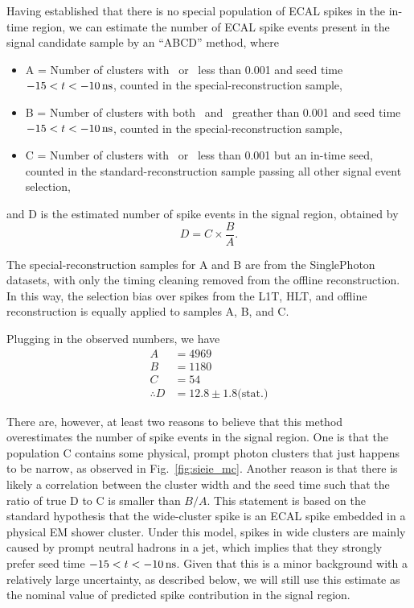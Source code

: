 Having established that there is no special population of ECAL spikes in the in-time region, we can estimate the number of ECAL spike events present in the signal candidate sample by an ``ABCD'' method, where
\begin{itemize}
  \item A = Number of clusters with \sieie\ or \sipip\ less than 0.001 and seed time $-15 < t < -10\, \text{ns}$, counted in the special-reconstruction sample,
  \item B = Number of clusters with both \sieie\ and \sipip\ greather than 0.001 and seed time $-15 < t < -10\, \text{ns}$, counted in the special-reconstruction sample, 
  \item C = Number of clusters with \sieie\ or \sipip\ less than 0.001 but an in-time seed, counted in the standard-reconstruction sample passing all other signal event selection, 
\end{itemize}
and D is the estimated number of spike events in the signal region, obtained by
\begin{equation}
  D = C \times \frac{B}{A}.
\end{equation}

The special-reconstruction samples for A and B are from the SinglePhoton datasets, with only the timing cleaning removed from the offline reconstruction.
In this way, the selection bias over spikes from the L1T, HLT, and offline reconstruction is equally applied to samples A, B, and C.

Plugging in the observed numbers, we have
\begin{align*}
  A & = 4969 \\
  B & = 1180 \\
  C & = 54 \\
  \therefore D & = 12.8 \pm 1.8 \text{(stat.)}
\end{align*}

There are, however, at least two reasons to believe that this method overestimates the number of spike events in the signal region. 
One is that the population C contains some physical, prompt photon clusters that just happens to be narrow, as observed in Fig.~\ref{fig:sieie_mc}. 
Another reason is that there is likely a correlation between the cluster width and the seed time such that the ratio of true D to C is smaller than $B/A$.
This statement is based on the standard hypothesis that the wide-cluster spike is an ECAL spike embedded in a physical EM shower cluster. 
Under this model, spikes in wide clusters are mainly caused by prompt neutral hadrons in a jet, which implies that they strongly prefer seed time $-15 < t < -10\, \text{ns}$. 
Given that this is a minor background with a relatively large uncertainty, as described below, we will still use this estimate as the nominal value of predicted spike contribution in the signal region.

